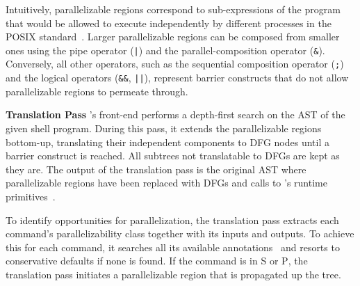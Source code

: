 \documentclass[letterpaper,twocolumn,10pt]{article}
\newcommand{\heading}[1]{\vspace{4pt}\noindent\textbf{#1}\enspace}
\newcommand{\ttt}[1]{\texttt{#1}}
\newcommand{\cn}[1]{\mbox{\textcircled{\footnotesize #1}}}
\newcommand{\sta}{\cn{\textsc{S}}\xspace}
\newcommand{\pur}{\cn{\textsc{P}}\xspace}
\newcommand{\kk}[1]{[{\color{magenta}kk: #1}]}
\newcommand{\tr}[1]{} %
\begin{document}
Intuitively, parallelizable regions correspond to sub-expressions of
the program that would be allowed to execute independently by
different processes in the POSIX standard~\cite{posix}. Larger
parallelizable regions can be composed from smaller ones using the
pipe operator (\ttt{|}) and the parallel-composition operator (\ttt{\&}).
Conversely, all other operators, such as the sequential composition operator (\ttt{;}) and the logical operators (\ttt{\&\&}, \ttt{||}), represent
barrier constructs that do not allow parallelizable regions to
permeate through.

% 
% 
% 

\heading{Translation Pass}
%
%
\sys's front-end performs a depth-first search on the AST of
the given shell program.  During this pass, it extends the
parallelizable regions bottom-up, translating their
independent components to DFG nodes until a barrier
construct is reached. All subtrees not translatable to DFGs are kept as they are. The output of the translation pass is the
original AST where parallelizable regions have been replaced with
DFGs and calls to \sys's runtime primitives~.

To identify opportunities for parallelization, the translation pass extracts each command's  parallelizability class together with its inputs and outputs.
To achieve this for each command, it searches all its available annotations~ and resorts to conservative defaults if none is found.
If the command is in \sta or \pur, the translation pass initiates a parallelizable region that is propagated up the tree.
\end{document}
